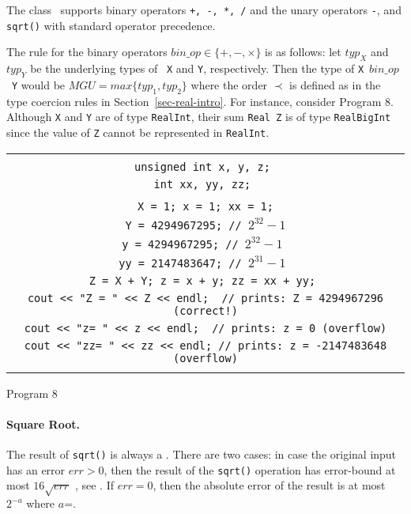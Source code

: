 The class \real\ supports binary operators {\tt +, -, *, /} and the
unary operators {\tt -}, and {\tt sqrt()} with standard
operator precedence.

The rule for the binary operators $bin\_op\in\{+,-,\times\}$ is as follows:
let $ typ_X $ and $ typ_Y $ be
the underlying types of \real\ {\tt X} and {\tt Y}, respectively.
Then the type of \mbox{{\tt X} $ bin\_op $ {\tt Y}}
would be $MGU=max \{ typ_1, typ_2 \} $ where the order $ \prec $ is defined
as in the type coercion rules in Section~\ref{sec-real-intro}.  
For instance, consider Program 8.  Although {\tt X} and {\tt Y}
are of type {\tt RealInt}, their sum {\tt Real Z} is 
of type {\tt RealBigInt} since the value of {\tt Z} cannot be represented
in {\tt RealInt}.

\nopagebreak
\begin{center}
\begin{tabular}{c}
\begin{progb}{
\> \tt Real X, Y, Z; \\
\> \tt unsigned int  x, y, z; \\
\> \tt int  xx, yy, zz; \\
\\
\> \tt X = 1; x = 1; xx = 1;\\
\> \tt Y =  4294967295; // $ 2^{32}-1 $\\
\> \tt y =  4294967295; // $ 2^{32}-1 $ \\
\> \tt yy = 2147483647; // $ 2^{31}-1 $ \\
\> \tt Z = X + Y;  z = x + y;  zz = xx + yy; \\
\> \tt cout << "Z = " << Z << endl; \ // prints: Z = 4294967296 (correct!)\\
\> \tt cout << "z= " << z << endl;  \ // prints: z = 0 (overflow)\\
\> \tt cout << "zz= " << zz << endl;  // prints: z = -2147483648 (overflow)\\
}\end{progb}
\end{tabular}
	Program 8
\end{center}

\paragraph{Square Root.}
The result of {\tt sqrt()} is always a \BF.
There are two cases: in case the original input has an error $err>0$,
then the result of the {\tt sqrt()} operation has
error-bound at most $16\sqrt{err}$ , see \cite{ouchi:thesis}.
If $err=0$, then the absolute error of the result is
at most $2^{-a}$ where $a$=.


